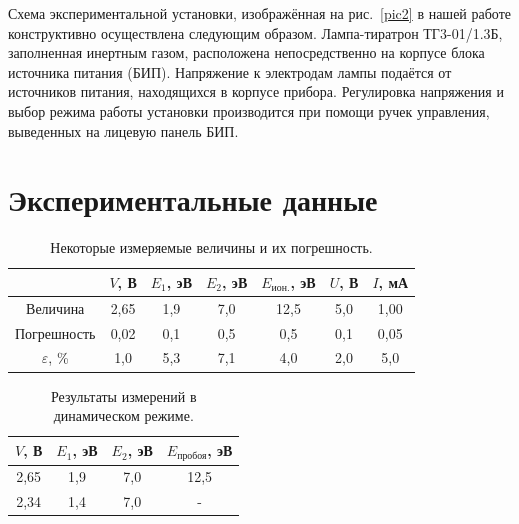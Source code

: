 \documentclass[a4paper,12pt]{article} %
\begin{document}
	Схема экспериментальной установки, изображённая на рис.~\ref{pic2} в нашей работе конструктивно осуществлена следующим образом. Лампа-тиратрон ТГ3-01/1.3Б, заполненная инертным газом, расположена непосредственно на корпусе блока источника питания (БИП). Напряжение к электродам лампы подаётся от источников питания, находящихся в корпусе прибора. Регулировка напряжения и выбор режима работы установки производится при помощи ручек управления, выведенных на лицевую панель БИП.
	
	
	\newpage
	\section{Экспериментальные данные}
		
	
	
		\begin{table}[H]
			\caption{Некоторые измеряемые величины и их погрешность.}
			\label{table:parametr}
			\begin{tabular}{|c|c|c|c|c|c|c|}
				\hline
				& $V$, В & $E_1$, эВ & $E_2$, эВ & $E_\text{ион.}$, эВ & $U$, В & $I$, мА \\ \hline
				Величина          & 2,65   & 1,9       & 7,0       & 12,5                & 5,0    & 1,00    \\ \hline
				Погрешность       & 0,02   & 0,1       & 0,5       & 0,5                 & 0,1    & 0,05    \\ \hline
				$\varepsilon$, \% & 1,0    & 5,3       & 7,1       & 4,0                 & 2,0    & 5,0     \\ \hline
			\end{tabular}
		\end{table}
		
		\begin{table}[H]
			\caption{Результаты измерений в динамическом режиме.}
			\label{table:exp1}
			\begin{tabular}{|c|c|c|c|}
				\hline
				$V$, В & $E_1$, эВ & $E_2$, эВ & $E_\text{пробоя}$, эВ \\ \hline
				2,65   & 1,9       & 7,0       & 12,5                \\ \hline
				2,34   & 1,4       & 7,0       & -                   \\ \hline
			\end{tabular}
		\end{table}
		
		
	
\end{document}
